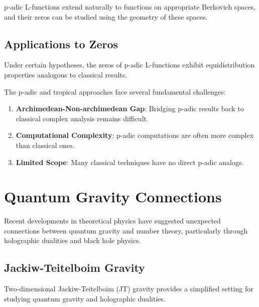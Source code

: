 \begin{theorem}
\label{thm:berkovich_thuillier}
p-adic L-functions extend naturally to functions on appropriate Berkovich spaces, and their zeros can be studied using the geometry of these spaces.
\end{theorem}

\subsection{Applications to Zeros}

\begin{proposition}
\label{prop:padic_zero_distribution}
Under certain hypotheses, the zeros of p-adic L-functions exhibit equidistribution properties analogous to classical results.
\end{proposition}

The p-adic and tropical approaches face several fundamental challenges:

\begin{enumerate}
\item \textbf{Archimedean-Non-archimedean Gap}: Bridging p-adic results back to classical complex analysis remains difficult.

\item \textbf{Computational Complexity}: p-adic computations are often more complex than classical ones.

\item \textbf{Limited Scope}: Many classical techniques have no direct p-adic analogs.
\end{enumerate}

\section{Quantum Gravity Connections}
\label{sec:quantum_gravity}

Recent developments in theoretical physics have suggested unexpected connections between quantum gravity and number theory, particularly through holographic dualities and black hole physics.

\subsection{Jackiw-Teitelboim Gravity}

Two-dimensional Jackiw-Teitelboim (JT) gravity provides a simplified setting for studying quantum gravity and holographic dualities.

